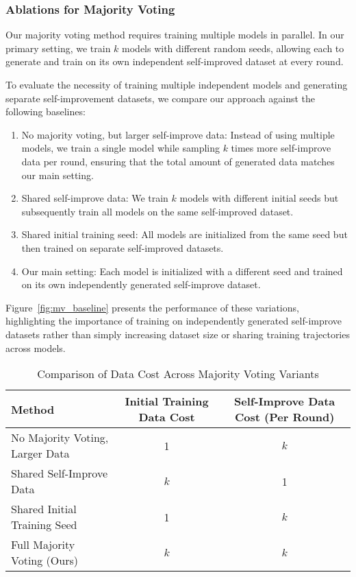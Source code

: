 \subsubsection{Ablations for Majority Voting}\label{sec:mv_ablations}

Our majority voting method requires training multiple models in parallel. In our primary setting, we train $k$ models with different random seeds, allowing each to generate and train on its own independent self-improved dataset at every round. 

To evaluate the necessity of training multiple independent models and generating separate self-improvement datasets, we compare our approach against the following baselines:
\begin{enumerate}
    \item No majority voting, but larger self-improve data: Instead of using multiple models, we train a single model while sampling $k$ times more self-improve data per round, ensuring that the total amount of generated data matches our main setting.
    \item Shared self-improve data: We train $k$ models with different initial seeds but subsequently train all models on the same self-improved dataset.
    \item Shared initial training seed: All models are initialized from the same seed but then trained on separate self-improved datasets.
    \item Our main setting: Each model is initialized with a different seed and trained on its own independently generated self-improve dataset.
\end{enumerate}

Figure~\ref{fig:mv_baseline} presents the performance of these variations, highlighting the importance of training on independently generated self-improve datasets rather than simply increasing dataset size or sharing training trajectories across models.

\begin{table}[ht!]
    \centering
    \caption{Comparison of Data Cost Across Majority Voting Variants}
    \footnotesize
    \small
    \setlength{\tabcolsep}{4pt}
    \renewcommand{\arraystretch}{0.5}
    {

    \label{tab:mv_data_cost}
    \begin{tabular}{lcc}
        \toprule
        \textbf{Method} & \textbf{Initial Training Data Cost} & \textbf{Self-Improve Data Cost (Per Round)} \\
        \midrule
        No Majority Voting, Larger Data & 1 & $k$ \\
        Shared Self-Improve Data & $k$ & 1 \\
        Shared Initial Training Seed & 1 & $k$ \\
        Full Majority Voting (Ours) & $k$ & $k$ \\
        \bottomrule
    \end{tabular}
    }
\end{table}


